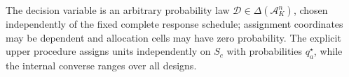 The decision variable is an arbitrary probability law \(\mathcal D\in\Delta(\mathcal A_K^n)\), chosen independently of the fixed complete response schedule; assignment coordinates may be dependent and allocation cells may have zero probability. The explicit upper procedure assigns units independently on \(S_c\) with probabilities \(q_a^\star\), while the internal converse ranges over all designs.